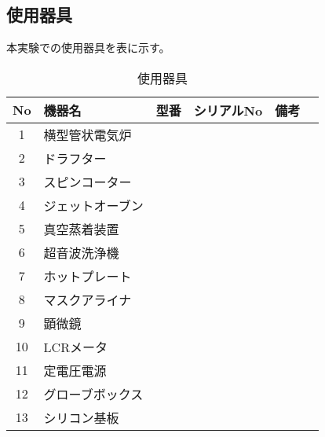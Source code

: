 \documentclass[11pt]{jarticle}
\begin{document}
	\subsection{使用器具}
		本実験での使用器具を表に示す。
		\begin{table}[H]
		\begin{center}
		\caption{使用器具}
		\label{tab:used}
		\begin{tabular}{clllll} \toprule
		No&\multicolumn{1}{l}{機器名}&\multicolumn{1}{l}{型番}&\multicolumn{1}{l}{シリアルNo}&\multicolumn{1}{l}{備考}\\ \hline
		1&横型管状電気炉&&&\\
		2&ドラフター&&&\\
		3&スピンコーター&&&\\
		4&ジェットオーブン&&&\\
		5&真空蒸着装置&&&\\
		6&超音波洗浄機&&&\\
		7&ホットプレート&&&\\
		8&マスクアライナ&&&\\
		9&顕微鏡&&&\\
		10&LCRメータ&&&\\
		11&定電圧電源&&&\\
		12&グローブボックス&&&\\
		13&シリコン基板&&&\\ \hline
		\end{tabular}
		\end{center}
		\end{table}
\end{document}
